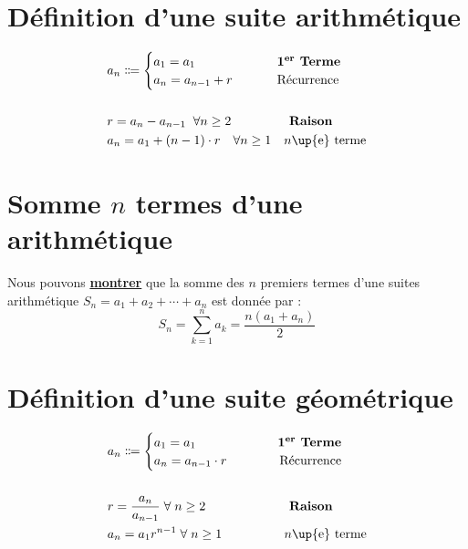 \documentclass{report}
\begin{document}
\begin{multicols*}{3}
    \section{Définition d'une suite arithmétique}    
    \vspace{-1em}
    \vspace{-1em}
    \begin{align*}
        &a_n \Coloneqq 
        \begin{cases}
            a_1 = a_1 & \hspace{2.5em} \textbf{1\textsuperscript{er} Terme}\\  
            a_{n} = a_{n-1} + r & \hspace{2.5em} \text{Récurrence}
        \end{cases}
        \\\\
        &r = a_n - a_{n-1} \;\; \forall n \geq 2  
        \quad\quad\quad\quad\;\;%
        \textbf{\hfill Raison}  
        \\
        &a_n = a_1 + \left(n - 1\right) \cdot r \quad \forall n \geq 1 
        \quad 
        \text{$n$\up{e} terme} \\
    \end{align*}

    \section{Somme $n$ termes d'une arithmétique}
    Nous pouvons \hyperlink{Somme des n premiers termes arithmétique}{\textbf{montrer}}
    que la somme des $n$ premiers termes d'une suites arithmétique
        $S_n = a_1 + a_2 + \cdots + a_n$ est donnée par :
    \[%
        \boxed{S_n = \sum_{k=1}^{n }a_k = \dfrac{n(a_1 + a_n)}{2}}
    \]%



    \section{Définition d'une suite géométrique}
        \begin{align*}
                &a_n \Coloneqq 
                \begin{cases}
                    a_1 = a_1 &\omit\quad\quad\quad \textbf{1\textsuperscript{er} Terme} 
                \\  
                    a_{n} = a_{n-1} \cdot r &\omit\hfill \quad\quad Récurrence 
            \end{cases} 
           \\\\ &r = \frac{a_n}{a_{n-1}} \; \forall \; n \geq 2 
                 \quad\quad\quad\quad\quad\quad\;\; \textbf{Raison} 
            \\ &a_n = a_1r^{n - 1} \; \forall \; n \geq 1 
        \text{\quad\quad\quad\quad\;\; $n$\up{e} terme} 
        \end{align*} 


\end{multicols*}
\end{document}
